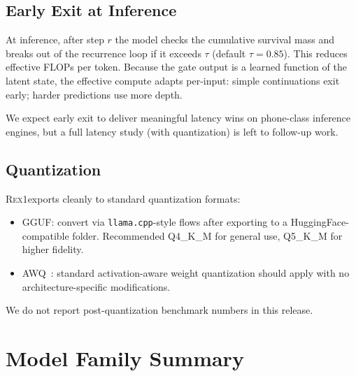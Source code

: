 \documentclass[11pt,a4paper]{article}
\newcommand{\REX}{\textsc{Rex1}\xspace}
\providecommand{\xspace}{}
\begin{document}
\subsection{Early Exit at Inference}

At inference, after step $r$ the model checks the cumulative survival mass
and breaks out of the recurrence loop if it exceeds $\tau$ (default
$\tau = 0.85$). This reduces effective FLOPs per token. Because the gate
output is a learned function of the latent state, the effective compute
adapts per-input: simple continuations exit early; harder predictions use
more depth.

We expect early exit to deliver meaningful latency wins on phone-class
inference engines, but a full latency study (with quantization) is left to
follow-up work.

\subsection{Quantization}

\REX exports cleanly to standard quantization formats:

\begin{itemize}[noitemsep,leftmargin=*]
  \item GGUF: convert via \texttt{llama.cpp}-style flows after exporting to
    a HuggingFace-compatible folder. Recommended Q4\_K\_M for general use,
    Q5\_K\_M for higher fidelity.
  \item AWQ~\cite{awq}: standard activation-aware weight quantization should
    apply with no architecture-specific modifications.
\end{itemize}

We do not report post-quantization benchmark numbers in this release.

\section{Model Family Summary}
\end{document}
